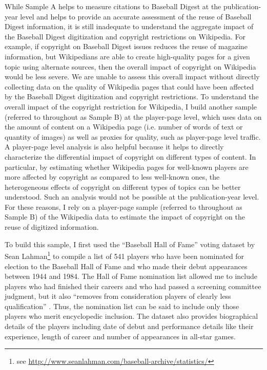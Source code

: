 \documentclass[11pt]{article}
\begin{document}
While Sample A helps to measure citations to Baseball Digest at the publication-year level and helps to provide an accurate assessment of the reuse of Baseball Digest information, it is still inadequate to understand the aggregate impact of the Baseball Digest digitization and copyright restrictions on Wikipedia. For example, if copyright on Baseball Digest issues reduces the reuse of magazine information, but Wikipedians are able to create high-quality pages for a given topic using alternate sources, then the overall impact of copyright on Wikipedia would be less severe. We are unable to assess this overall impact without directly collecting data on the quality of Wikipedia pages that could have been affected by the Baseball Digest digitization and copyright restrictions. To understand the overall impact of the copyright restriction for Wikipedia, I build another sample (referred to throughout as Sample B) at the player-page level, which uses data on the amount of content on a Wikipedia page (i.e. number of words of text or quantity of images) as well as proxies for quality, such as player-page level traffic. A player-page level analysis is also helpful because it helps to directly characterize the differential impact of copyright on different types of content. In particular, by estimating whether Wikipedia pages for well-known players are more affected by copyright as compared to less well-known ones, the heterogeneous effects of copyright on different types of topics can be better understood. Such an analysis would not be possible at the publication-year level.  For these reasons, I rely on a player-page sample (referred to throughout as Sample B) of the Wikipedia data to estimate the impact of copyright on the reuse of digitized information.

To build this sample, I first used the ``Baseball Hall of Fame'' voting dataset by Sean Lahman\footnote{see \url{http://www.seanlahman.com/baseball-archive/statistics/}} to compile a list of 541 players who have been nominated for election to the Baseball Hall of Fame and who made their debut appearances between 1944 and 1984. The Hall of Fame nomination list allowed me to include players who had finished their careers and who had passed a screening committee judgment, but it also ``removes from consideration players of clearly less qualification'' \citep{abbott_future_2011}. Thus, the nomination list can be said to include only those players who merit encyclopedic inclusion. The dataset also provides biographical details of the players including date of debut and performance details like their experience, length of career and number of appearances in all-star games.  
\end{document}
